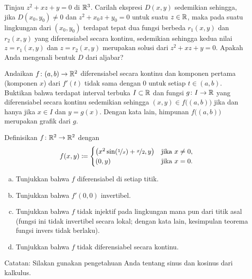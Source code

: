 \begin{exercise}
Tinjau $z^2 + xz + y =0$ di ${\mathbb{R}}^3$.  Carilah ekspresi $D(x,y)$ sedemikian sehingga,
jika $D(x_0,y_0) \neq 0$ dan $z^2+x_0z+y_0 = 0$ untuk suatu $z \in {\mathbb{R}}$,
maka pada suatu lingkungan dari $(x_0,y_0)$ terdapat
tepat dua fungsi berbeda $r_1(x,y)$
dan $r_2(x,y)$ yang diferensiabel secara kontinu, sedemikian sehingga kedua nilai
$z=r_1(x,y)$ dan $z=r_2(x,y)$ merupakan solusi dari $z^2 + xz + y =0$.
Apakah Anda mengenali bentuk $D$ dari aljabar?
\end{exercise}


\begin{exercise}
Andaikan $f \colon (a,b) \to {\mathbb{R}}^2$ diferensiabel secara kontinu dan
komponen pertama (komponen $x$) dari $f'(t)$ tidak sama dengan 0
untuk setiap $t \in (a,b)$.
Buktikan bahwa terdapat interval terbuka $I \subset {\mathbb{R}}$ dan
fungsi $g \colon I \to {\mathbb{R}}$ yang diferensiabel secara kontinu
sedemikian sehingga 
$(x,y) \in f\bigl((a,b)\bigr)$ jika dan hanya jika $x \in I$ dan $y=g(x)$.
Dengan kata lain, himpunan
$f\bigl((a,b)\bigr)$ merupakan grafik dari $g$.
\end{exercise}

\begin{samepage}
\begin{exercise}
Definisikan $f \colon {\mathbb{R}}^2 \to {\mathbb{R}}^2$ dengan
\begin{equation*}
f(x,y) \coloneqq
\begin{cases}
\bigl(x^2 \sin (\nicefrac{1}{x}) + \nicefrac{x}{2} , y \bigr) &
 \text{jika } x \neq 0, \\
(0,y) &
 \text{jika } x=0.
\end{cases}
\end{equation*}
\begin{enumerate}[a)]
\item
Tunjukkan bahwa $f$ diferensiabel di setiap titik.
\item
Tunjukkan bahwa $f'(0,0)$ invertibel.
\item
Tunjukkan bahwa $f$ tidak injektif pada lingkungan mana pun dari titik asal (fungsi ini
tidak invertibel secara lokal; dengan kata lain, kesimpulan teorema fungsi invers tidak berlaku).
\item
Tunjukkan bahwa $f$ tidak diferensiabel secara kontinu.
\end{enumerate}
Catatan: Silakan gunakan pengetahuan Anda tentang sinus dan kosinus dari kalkulus.
\end{exercise}
\end{samepage}

